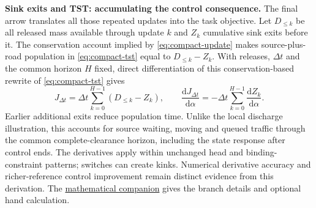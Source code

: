 \documentclass[10pt,a4paper]{article}
\begin{document}
\textbf{Sink exits and TST: accumulating the control consequence.}
The final arrow translates all those repeated updates into the task
objective. Let $D_{\leq k}$ be all released mass available through update
$k$ and $Z_k$ cumulative sink exits before it.
The conservation account implied by \eqref{eq:compact-update} makes
source-plus-road population in \eqref{eq:compact-tst} equal to
$D_{\leq k}-Z_k$. With releases, $\Delta t$ and the common horizon $H$
fixed, direct differentiation of this conservation-based rewrite of \eqref{eq:compact-tst} gives
\begin{equation}
 J_{\Delta t}=\Delta t\sum_{k=0}^{H-1}(D_{\leq k}-Z_k),\qquad
 \frac{\mathrm dJ_{\Delta t}}{\mathrm d\alpha}
 =-\Delta t\sum_{k=0}^{H-1}\frac{\mathrm dZ_k}{\mathrm d\alpha}.
 \label{eq:compact-objective-derivative}
\end{equation}
Earlier additional exits reduce population time. Unlike the local
discharge illustration, this accounts for source waiting, moving and
queued traffic through the common complete-clearance horizon, including
the state response after control ends.
The derivatives apply within unchanged head and binding-constraint
patterns; switches can create kinks. Numerical derivative accuracy and
richer-reference control improvement remain distinct evidence from this
derivation. The \href{urban_methodology_specification_clean.pdf}{mathematical companion}
gives the branch details and optional hand calculation.
\end{document}
